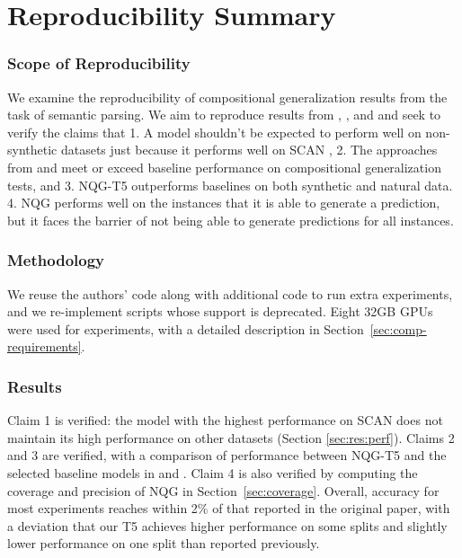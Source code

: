 \section*{\centering Reproducibility Summary}
\subsubsection*{Scope of Reproducibility}
We examine the reproducibility of compositional generalization results from the task of semantic parsing. We aim to reproduce results from \cite{shaw-etal-2021-compositional}, \cite{kim2021sequencetosequence}, and \cite{kim-linzen-2020-cogs} and seek to verify the claims that 1. A model shouldn't be expected to perform well on non-synthetic datasets just because it performs well on SCAN \cite{shaw-etal-2021-compositional}, 
2. The approaches from \cite{shaw-etal-2021-compositional} and \cite{kim2021sequencetosequence} meet or exceed baseline performance on compositional generalization tests, and 
3. NQG-T5 \cite{shaw-etal-2021-compositional} outperforms baselines on both synthetic and natural data.
4. NQG \cite{shaw-etal-2021-compositional} performs well on the instances that it is able to generate a prediction, but it faces the barrier of not being able to generate predictions for all instances.

\subsubsection*{Methodology}

We reuse the authors' code along with additional code to run extra experiments, and we re-implement scripts whose support is deprecated. Eight 32GB GPUs were used for experiments, with a detailed description in Section~\ref{sec:comp-requirements}. 

\subsubsection*{Results}

Claim 1 is verified: the model with the highest performance on SCAN does not maintain its high performance on other datasets (Section \ref{sec:res:perf}). Claims 2 and 3 are verified, with a comparison of performance between NQG-T5 and the selected baseline models in \cite{shaw-etal-2021-compositional} and \cite{kim2021sequencetosequence}. Claim 4 is also verified by computing the coverage and precision of NQG in Section~\ref{sec:coverage}.
Overall, accuracy for most experiments reaches within 2\% of that reported in the original paper, with a deviation that our T5 achieves higher performance on some splits and slightly lower performance on one split than reported previously.

